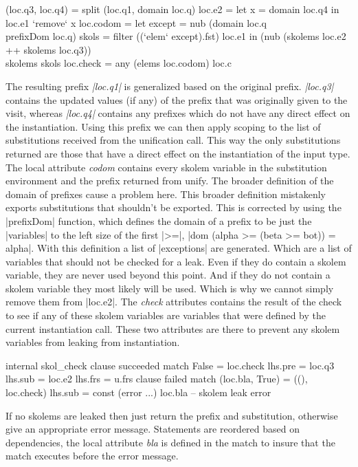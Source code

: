 \begin{code}   
(loc.q3, loc.q4) = split (loc.q1, domain loc.q)
loc.e2 =  let x = domain loc.q4
          in loc.e1 `remove` x
loc.codom = let except = nub (domain loc.q \\ prefixDom loc.q)
                skols  = filter ((`elem` except).fst) loc.e1
            in  (nub (skolems loc.e2 ++ skolems loc.q3)) \\ skolems skols
loc.check  = any (elems loc.codom) loc.c
\end{code}
The resulting prefix \emph{|loc.q1|} is generalized based on the original prefix. \emph{|loc.q3|} contains the updated values (if any) of the prefix that was originally given to the visit, whereas \emph{|loc.q4|} contains any prefixes which do not have any direct effect on the instantiation. Using this prefix we can then apply scoping to the list of substitutions received from the unification call. This way the only substitutions returned are those that have a direct effect on the instantiation of the input type.
The local attribute \emph{codom} contains every skolem variable in the substitution environment and the prefix returned from unify. The broader definition of the domain of prefixes cause a problem here. This broader definition mistakenly exports substitutions that shouldn't be exported. This is corrected by using the |prefixDom| function, which defines the domain of a prefix to be just the |variables| to the left size of the first |>=|, |dom (alpha >= (beta >= bot)) = {alpha}|. With this definition a list of |exceptions| are generated. Which are a list of variables that should not be checked for a leak. Even if they do contain a skolem variable, they are never used beyond this point. And if they do not contain a skolem variable they most likely will be used. Which is why we cannot simply remove them from |loc.e2|.
The \emph{check} attributes contains the result of the check to see if any of these skolem variables are variables that were defined by the current instantiation call. These two attributes are there to prevent any skolem variables from leaking from instantiation.

\begin{code}
internal skol_check
  clause succeeded
    match False  = loc.check
    lhs.pre  = loc.q3
    lhs.sub  = loc.e2
    lhs.frs  = u.frs
  clause failed
    match (loc.bla, True) = ((), loc.check)
    lhs.sub = const (error ...) loc.bla -- skolem leak error
\end{code}
If no skolems are leaked then just return the prefix and substitution, otherwise give an appropriate error message. Statements are reordered based on dependencies, the local attribute \emph{bla} is defined in the match to insure that the match executes before the error message.

